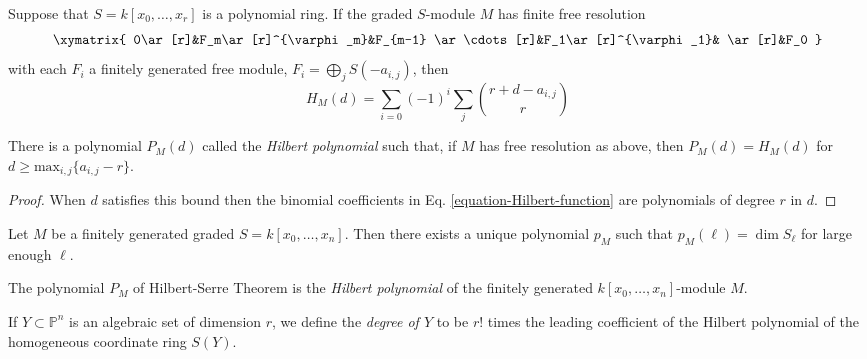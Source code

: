 \documentclass{book}
\begin{document}
\begin{lemma}
\label{lemma-Hilbert-function}
Suppose that $S=k[x_0,\ldots,x_r]$ is a
polynomial ring. If the graded
$S$-module $M$ has finite free resolution
$$
\xymatrix{
0\ar[r]&F_m\ar[r]^{\varphi_m}&F_{m-1}
\ar\cdots[r]&F_1\ar[r]^{\varphi_1}&
\ar[r]&F_0
}
$$
with each $F_i$ a finitely generated free
module,
$F_i=\bigoplus_{j}S(-a_{i,j})$, then
\begin{equation}
\label{equation-Hilbert-function}
H_M(d)=\sum_{i=0}(-1)^i\sum_{j}\binom{r+d-
a_{i,j}}{r}
\end{equation}
\end{lemma}

\begin{lemma}
\label{lemma-hilbe-funct-becom-polyn}
There is a polynomial $P_M(d)$ called the
{\it Hilbert polynomial} such that, if
$M$ has free resolution as above, then
$P_M(d)=H_M(d)$ for
$d\geq\text{max}_{i,j}\{a_{i,j}-r\}$.
\end{lemma}

\begin{proof}
When $d$ satisfies this bound then the
binomial coefficients in Eq.
\ref{equation-Hilbert-function} are
polynomials of degree $r$ in $d$.
\end{proof}

\begin{theorem}
\label{theorem-Hilbert-Serre}
\begin{reference}
\cite[I, Theorem 7.5]{hart}
\end{reference}
Let $M$ be a finitely generated graded
$S=k[x_0,\ldots,x_n]$. Then there exists
a unique polynomial $p_M$ such that
$p_M(\ell)=\dim S_\ell$ for large enough
$\ell$.
\end{theorem}

\begin{definition}
\label{definition-Hilbert-polynomial}
\begin{reference}
\cite[I, p. 52]{har}
\end{reference}
The polynomial $P_M$ of Hilbert-Serre Theorem
\cite{Hilbert-Serre} is the {\it
Hilbert polynomial} of the finitely generated
$k[x_0,\ldots,x_n]$-module $M$.
\end{definition}

\begin{definition}
\label{definition-degre-proje-varie}
\begin{reference}
\cite[p. 52]{hart}
\end{reference}
If $Y\subset \mathbb{P}^n$ is an algebraic
set of dimension $r$, we define the
{\it degree of $Y$} to be $r!$ times the
leading coefficient of the Hilbert
polynomial of the homogeneous coordinate ring
$S(Y)$.
\end{definition}
\end{document}
